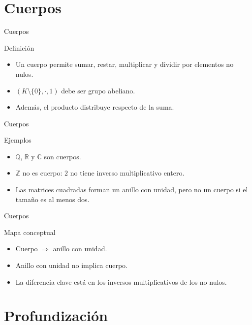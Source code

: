 \documentclass[aspectratio=169,11pt]{beamer}
\begin{document}
\section{Cuerpos}

\begin{frame}{Cuerpos}
\begin{block}{Definición}
\begin{itemize}
  \item Un cuerpo permite sumar, restar, multiplicar y dividir por elementos no nulos.
  \item \((K\setminus\{0\},\cdot,1)\) debe ser grupo abeliano.
  \item Además, el producto distribuye respecto de la suma.
\end{itemize}
\end{block}
\end{frame}

\begin{frame}{Cuerpos}
\begin{block}{Ejemplos}
\begin{itemize}
  \item \(\mathbb{Q}\), \(\mathbb{R}\) y \(\mathbb{C}\) son cuerpos.
  \item \(\mathbb{Z}\) no es cuerpo: \(2\) no tiene inverso multiplicativo entero.
  \item Las matrices cuadradas forman un anillo con unidad, pero no un cuerpo si el tamaño es al menos dos.
\end{itemize}
\end{block}
\end{frame}

\begin{frame}{Cuerpos}
\begin{block}{Mapa conceptual}
\begin{itemize}
  \item Cuerpo \(\Rightarrow\) anillo con unidad.
  \item Anillo con unidad no implica cuerpo.
  \item La diferencia clave está en los inversos multiplicativos de los no nulos.
\end{itemize}
\end{block}
\end{frame}

\section{Profundización}
\end{document}
